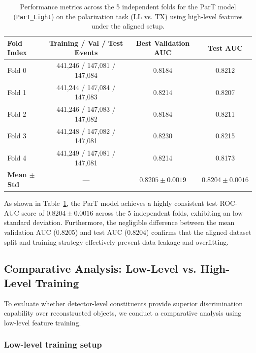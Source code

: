 \documentclass[12pt]{article}
\begin{document}
			\begin{table}[htbp]
				\centering
				\caption{Performance metrics across the 5 independent folds for the ParT model (\texttt{ParT\_Light}) on the polarization task (LL vs. TX) using high-level features under the aligned setup.}
				\label{tab:part_5fold_aligned_results}
				\begin{tabular}{l|c|cc}
					\hline
					\hline
					Fold Index & Training / Val / Test Events & Best Validation AUC & Test AUC \\
					\hline
					Fold 0 & 441,246 / 147,081 / 147,084 & 0.8184 & 0.8212 \\
					Fold 1 & 441,244 / 147,084 / 147,083 & 0.8214 & 0.8207 \\
					Fold 2 & 441,246 / 147,083 / 147,082 & 0.8184 & 0.8211 \\
					Fold 3 & 441,248 / 147,082 / 147,081 & 0.8230 & 0.8215 \\
					Fold 4 & 441,249 / 147,081 / 147,081 & 0.8214 & 0.8173 \\
					\hline
					\textbf{Mean $\pm$ Std} & --- & \textbf{$0.8205 \pm 0.0019$} & \textbf{$0.8204 \pm 0.0016$} \\
					\hline
					\hline
				\end{tabular}
			\end{table}

			As shown in Table~\ref{tab:part_5fold_aligned_results}, the ParT model achieves a highly consistent test ROC-AUC score of $0.8204 \pm 0.0016$ across the 5 independent folds, exhibiting an low standard deviation. Furthermore, the negligible difference between the mean validation AUC ($0.8205$) and test AUC ($0.8204$) confirms that the aligned dataset split and training strategy effectively prevent data leakage and overfitting.


	\subsection{Comparative Analysis: Low-Level vs. High-Level Training}%
	\label{sub:comparative_analysis_low_level_vs_high_level_training}

		To evaluate whether detector-level constituents provide superior discrimination capability over reconstructed objects, we conduct a comparative analysis using low-level feature training.

        \subsubsection{Low-level training setup}%
        \label{subs:low_level_training_setup}
\end{document}

